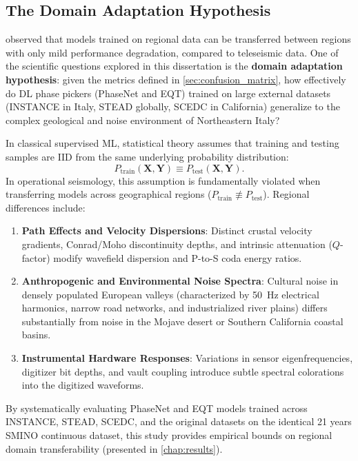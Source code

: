 \subsection{The Domain Adaptation Hypothesis}
\label{subsec:domain_adaptation_hypothesis}

\textcite{WhichPicker} observed that models trained on regional data can be
transferred between regions with only mild performance degradation, compared to
teleseismic data. One of the scientific questions explored in this dissertation
is the \textbf{domain adaptation hypothesis}: given the metrics defined in
\cref{sec:confusion_matrix}, how effectively do \ac{DL} phase pickers
(\ac{PhaseNet} and \ac{EQT}) trained on large external datasets (\ac{INSTANCE}
in Italy, \ac{STEAD} globally, \ac{SCEDC} in California) generalize to the
complex geological and noise environment of Northeastern Italy?

In classical supervised \ac{ML}, statistical theory assumes that training and
testing samples are \ac{IID} from the same underlying probability distribution:
\begin{equation}
  P_{\mathrm{train}}(\mathbf{X}, \mathbf{Y}) \equiv
  P_{\mathrm{test}}(\mathbf{X}, \mathbf{Y}).
  \label{eq:iid_assumption}
\end{equation}
In operational seismology, this assumption is fundamentally violated when
transferring models across geographical regions ($P_{\mathrm{train}} \not\equiv
P_{\mathrm{test}}$). Regional differences include:
\begin{enumerate}
  \item \textbf{Path Effects and Velocity Dispersions}: Distinct crustal
    velocity gradients, Conrad/Moho discontinuity depths, and intrinsic
    attenuation ($Q$-factor) modify wavefield dispersion and P-to-S coda energy
    ratios.
  \item \textbf{Anthropogenic and Environmental Noise Spectra}: Cultural noise
    in densely populated European valleys (characterized by \qty{50}{\hertz}
      electrical harmonics, narrow road networks, and industrialized river
    plains) differs substantially from noise in the Mojave desert or Southern
    California coastal basins.
  \item \textbf{Instrumental Hardware Responses}: Variations in
    sensor eigenfrequencies, digitizer bit depths, and vault
    coupling introduce subtle spectral colorations into the
    digitized waveforms.
\end{enumerate}

By systematically evaluating \ac{PhaseNet} and \ac{EQT} models trained across
\ac{INSTANCE}, \ac{STEAD}, \ac{SCEDC}, and the original datasets on the
identical \num{21} years \ac{SMINO} continuous dataset, this study provides
empirical bounds on regional domain transferability (presented in
\cref{chap:results}).
